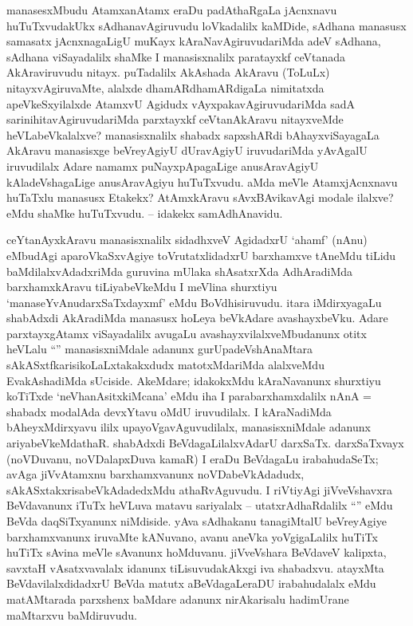 \begin{artha}
manasesxMbudu AtamxanAtamx eraDu padAthaRgaLa jAcnxnavu huTuTxvudakUkx sAdhanavAgiruvudu loVkadalilx kaMDide, sAdhana manasusx samasatx jAcnxnagaLigU muKayx kAraNavAgiruvudariMda adeV sAdhana, sAdhana viSayadalilx shaMke I manasisxnalilx paratayxkf ceVtanada AkAraviruvudu nitayx. puTadalilx AkAshada AkAravu (ToLuLx) nitayxvAgiruvaMte, alalxde dhamARdhamARdigaLa nimitatxda apeVkeSxyilalxde AtamxvU Agidudx vAyxpakavAgiruvudariMda sadA sarinihitavAgiruvudariMda parxtayxkf ceVtanAkAravu nitayxveMde heVLabeVkalalxve? manasisxnalilx shabadx sapxshARdi bAhayxviSayagaLa AkAravu manasisxge beVreyAgiyU dUravAgiyU iruvudariMda yAvAgalU iruvudilalx Adare namamx puNayxpApagaLige anusAravAgiyU kAladeVshagaLige anusAravAgiyu huTuTxvudu. aMda meVle AtamxjAcnxnavu huTaTxlu manasusx Etakekx? AtAmxkAravu sAvxBAvikavAgi modale ilalxve? eMdu shaMke huTuTxvudu. -- idakekx samAdhAnavidu. 

ceYtanAyxkAravu manasisxnalilx sidadhxveV AgidadxrU `ahamf' (nAnu) eMbudAgi aparoVkaSxvAgiye toVrutatxlidadxrU barxhamxve tAneMdu tiLidu baMdilalxvAdadxriMda guruvina mUlaka shAsatxrXda AdhAradiMda barxhamxkAravu tiLiyabeVkeMdu I meVlina shurxtiyu `manaseYvAnudarxSaTxdayxmf' eMdu BoVdhisiruvudu. itara iMdirxyagaLu shabAdxdi AkAradiMda manasusx hoLeya beVkAdare avashayxbeVku. Adare parxtayxgAtamx viSayadalilx avugaLu avashayxvilalxveMbudanunx otitx heVLalu ``\stext'' manasisxniMdale adanunx gurUpadeVshAnaMtara sAkASxtfkarisikoLaLxtakakxdudx matotxMdariMda alalxveMdu EvakAshadiMda sUciside. AkeMdare; idakokxMdu kAraNavanunx shurxtiyu koTiTxde `neVhanAsitxkiMcana' eMdu iha I parabarxhamxdalilx nAnA = shabadx modalAda devxYtavu oMdU iruvudilalx. I kAraNadiMda bAheyxMdirxyavu ililx upayoVgavAguvudilalx, manasisxniMdale adanunx ariyabeVkeMdathaR. shabAdxdi BeVdagaLilalxvAdarU darxSaTx. darxSaTxvayx (noVDuvanu, noVDalapxDuva kamaR) I eraDu BeVdagaLu irabahudaSeTx; avAga jiVvAtamxnu barxhamxvanunx noVDabeVkAdadudx, sAkASxtakxrisabeVkAdadedxMdu athaRvAguvudu. I riVtiyAgi jiVveVshavxra BeVdavanunx iTuTx heVLuva matavu sariyalalx -- utatxrAdhaRdalilx ``\stext'' eMdu BeVda daqSiTxyanunx niMdiside. yAva sAdhakanu tanagiMtalU beVreyAgiye barxhamxvanunx iruvaMte kANuvano, avanu aneVka yoVgigaLalilx huTiTx huTiTx sAvina meVle sAvanunx hoMduvanu. jiVveVshara BeVdaveV kalipxta, savxtaH vAsatxvavalalx idanunx tiLisuvudakAkxgi iva shabadxvu. atayxMta BeVdavilalxdidadxrU BeVda matutx aBeVdagaLeraDU irabahudalalx eMdu matAMtarada parxshenx baMdare adanunx nirAkarisalu hadimUrane maMtarxvu baMdiruvudu.
\end{artha}

